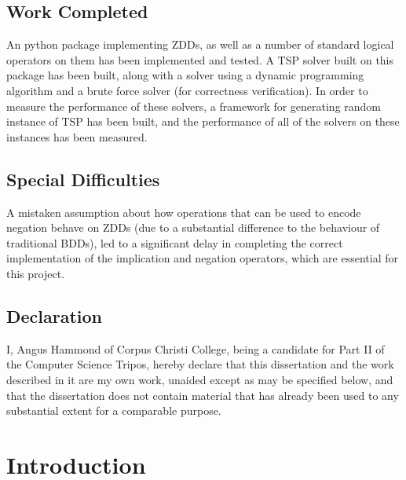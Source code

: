 \documentclass[12pt,a4paper,twoside,openright]{report}
\begin{document}
\section*{Work Completed}

An python package implementing ZDDs, as well as a number of standard logical operators on them has been implemented and tested. A TSP solver built on this package has been built, along with a solver using a dynamic programming algorithm and a brute force solver (for correctness verification). In order to measure the performance of these solvers, a framework for generating random instance of TSP has been built, and the performance of all of the solvers on these instances has been measured.

\section*{Special Difficulties}

A mistaken assumption about how operations that can be used to encode negation behave on ZDDs (due to a substantial difference to the behaviour of traditional BDDs), led to a significant delay in completing the correct implementation of the implication and negation operators, which are essential for this project.
 
\newpage
\section*{Declaration}

I, Angus Hammond of Corpus Christi College, being a candidate for Part II of the Computer
Science Tripos, hereby declare
that this dissertation and the work described in it are my own work,
unaided except as may be specified below, and that the dissertation
does not contain material that has already been used to any substantial
extent for a comparable purpose.

\bigskip
{}

\medskip
{}

\tableofcontents

\listoffigures


\pagestyle{headings}

\chapter{Introduction}
\end{document}
